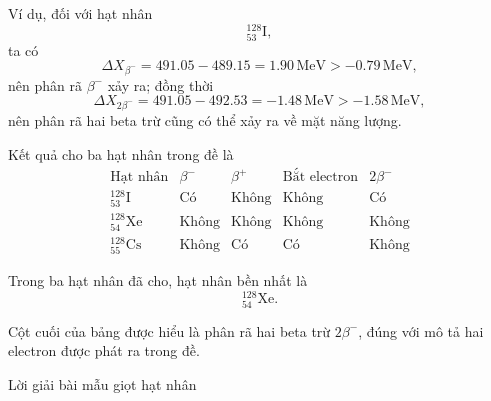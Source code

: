 \documentclass[12pt,a4paper]{article}
\begin{document}
\begin{enumerate}[leftmargin=*,itemsep=1em]
\begin{enumerate}[label=\alph*.,leftmargin=2em,itemsep=1em]
Ví dụ, đối với hạt nhân
$$
{}_{53}^{128}\mathrm I,
$$
ta có
$$
\Delta X_{\beta^-}=491.05-489.15=1.90\,\mathrm{MeV}>-0.79\,\mathrm{MeV},
$$
nên phân rã $\beta^-$ xảy ra; đồng thời
$$
\Delta X_{2\beta^-}=491.05-492.53=-1.48\,\mathrm{MeV}>-1.58\,\mathrm{MeV},
$$
nên phân rã hai beta trừ cũng có thể xảy ra về mặt năng lượng.

Kết quả cho ba hạt nhân trong đề là
$$
\begin{array}{c|c|c|c|c}
\text{Hạt nhân}&\beta^-&\beta^+&\text{Bắt electron}&2\beta^-\\ \hline
{}_{53}^{128}\mathrm I&\text{Có}&\text{Không}&\text{Không}&\text{Có}\\
{}_{54}^{128}\mathrm{Xe}&\text{Không}&\text{Không}&\text{Không}&\text{Không}\\
{}_{55}^{128}\mathrm{Cs}&\text{Không}&\text{Có}&\text{Có}&\text{Không}
\end{array}
$$

Trong ba hạt nhân đã cho, hạt nhân bền nhất là
$$
{}_{54}^{128}\mathrm{Xe}.
$$

Cột cuối của bảng được hiểu là phân rã hai beta trừ $2\beta^-$, đúng với mô tả
hai electron được phát ra trong đề.

\end{enumerate}
\end{enumerate}

\newpage
\begin{center}
Lời giải bài mẫu giọt hạt nhân
\end{center}
\end{document}
